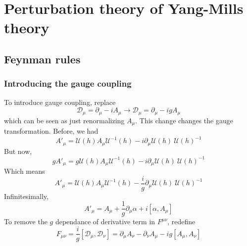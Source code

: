 \documentclass[a4paper]{book}
\theoremstyle{definition}
\theoremstyle{remark}
\begin{document}
\section{Perturbation theory of Yang-Mills theory}

\subsection{Feynman rules}
\subsubsection{Introducing the gauge coupling}

To introduce gauge coupling, replace 
\begin{equation}
    \mathcal D_\mu = \partial_\mu - i A_\mu \rightarrow \mathcal D_\mu = \partial_\mu - i g A_\mu 
\end{equation}
which can be seen as just renormalizing $A_\mu$. This change changes the gauge transformation. Before, we had 
\begin{equation}
    A'_\mu = \mathcal U(h)A_\mu \mathcal U^{-1}(h) - i\partial_\mu \mathcal{U}(h) ~ \mathcal{U}(h)^{-1}
\end{equation}
But now,
\begin{equation}
   g A'_\mu = g\mathcal U(h)A_\mu \mathcal U^{-1}(h) - i\partial_\mu \mathcal{U}(h) ~ \mathcal{U}(h)^{-1}
\end{equation}
Which means 
\begin{equation}
    A'_\mu = \mathcal U(h)A_\mu \mathcal U^{-1}(h) - \frac{i}{g}\partial_\mu \mathcal{U}(h) ~ \mathcal{U}(h)^{-1}
\end{equation}
Infinitesimally, 
\begin{equation}
    A'_\mu = A_\mu + \frac{1}{g}\partial_\mu \alpha + i [\alpha, A_\mu ]
\end{equation}
To remove the $g$ dependance of derivative term in $F^{\mu\nu}$, redefine 
\begin{equation}
    F_{\mu\nu} = \frac{i}{g}[\mathcal D_\mu, \mathcal D_\nu] = \partial_\mu A_\nu - \partial_\nu A_\mu - ig[A_\mu, A_\nu]
\end{equation}
\end{document}
